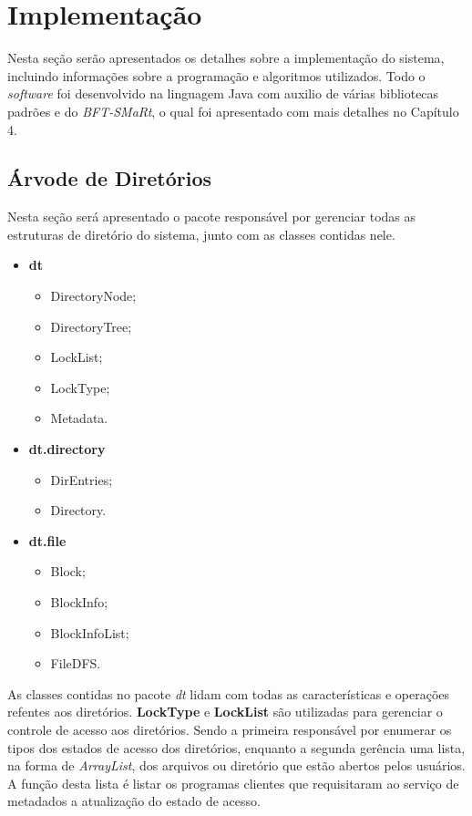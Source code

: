
\section{Implementação}
Nesta seção serão apresentados os detalhes sobre a implementação do sistema, incluindo informações sobre a programação e algoritmos utilizados. Todo o \textit{software} foi desenvolvido na linguagem Java com auxilio de várias bibliotecas padrões e do \textit{BFT-SMaRt}, o qual foi apresentado com mais detalhes no Capítulo 4. 
\\


\subsection{Árvode de Diretórios}
Nesta seção será apresentado o pacote responsável por gerenciar todas as estruturas de diretório do sistema, junto com as classes contidas nele.
\\

\begin{itemize}
	\item \textbf{dt}
	\begin{itemize}
		\item DirectoryNode;
		\item DirectoryTree;
		\item LockList;
		\item LockType;
		\item Metadata.
	\end{itemize}
	\item \textbf{dt.directory}
	\begin{itemize}
		\item DirEntries;
		\item Directory.
	\end{itemize}
	\item \textbf{dt.file}
	\begin{itemize}
		\item Block;
		\item BlockInfo;
		\item BlockInfoList;
		\item FileDFS.
	\end{itemize}
\end{itemize}

As classes contidas no pacote \textit{dt} lidam com todas as características e operações refentes aos diretórios. \textbf{LockType} e \textbf{LockList} são utilizadas para gerenciar o controle de acesso aos diretórios. Sendo a primeira responsável por enumerar os tipos dos estados de acesso dos diretórios, enquanto a segunda gerência uma lista, na forma de \textit{ArrayList}, dos arquivos ou diretório que estão abertos pelos usuários. A função desta lista é listar os programas clientes que requisitaram ao serviço de metadados a atualização do estado de acesso. 
\\

